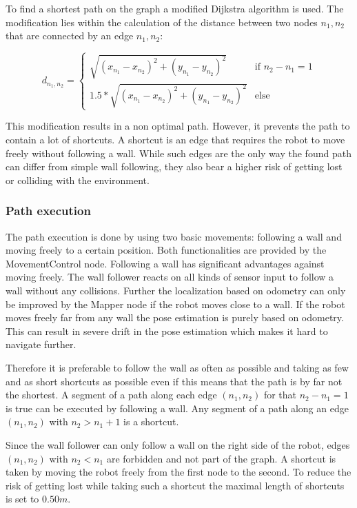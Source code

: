 To find a shortest path on the graph a modified Dijkstra algorithm is used. The modification lies within the calculation of the distance between two nodes $n_1, n_2$ that are connected by an edge $n_1, n_2$:

\begin{equation}
 	d_{n_1,n_2} = 
		\begin{cases}
			\sqrt{(x_{n_1} - x_{n_2})^2 + (y_{n_1} - y_{n_2})^2} & \text{if } n_2 - n_1 = 1 \\
			1.5 * \sqrt{(x_{n_1} - x_{n_2})^2 + (y_{n_1} - y_{n_2})^2} & \text{else }
		\end{cases}
\end{equation}  

This modification results in a non optimal path. However, it prevents the path to contain a lot of shortcuts. A shortcut is an edge that requires the robot to move freely without following a wall. While such edges are the only way the found path can differ from simple wall following, they also bear a higher risk of getting lost or colliding with the environment.

\subsubsection{Path execution}
\label{subsubsec:pathExec}
The path execution is done by using two basic movements: following a wall and moving freely to a certain position. Both functionalities are provided by the MovementControl node. Following a wall has significant advantages against moving freely. The wall follower reacts on all kinds of sensor input to follow a wall without any collisions. Further the localization based on odometry can only be improved by the Mapper node if the robot moves close to a wall. If the robot moves freely far from any wall the pose estimation is purely based on odometry. This can result in severe drift in the pose estimation which makes it hard to navigate further. 

Therefore it is preferable to follow the wall as often as possible and taking as few and as short shortcuts as possible even if this means that the path is by far not the shortest. 
A segment of a path along each edge $(n_1, n_2)$ for that $n_2 - n_1 = 1$ is true can be executed by following a wall. 
Any segment of a path along an edge $(n_1, n_2)$ with $n_2 > n_1 + 1$ is a shortcut. 

Since the wall follower can only follow a wall on the right side of the robot, edges $(n_1, n_2)$ with $n_2 < n_1$ are forbidden and not part of the graph. A shortcut is taken by moving the robot freely from the first node to the second. To reduce the risk of getting lost while taking such a shortcut the maximal length of shortcuts is set to $0.50m$.   

